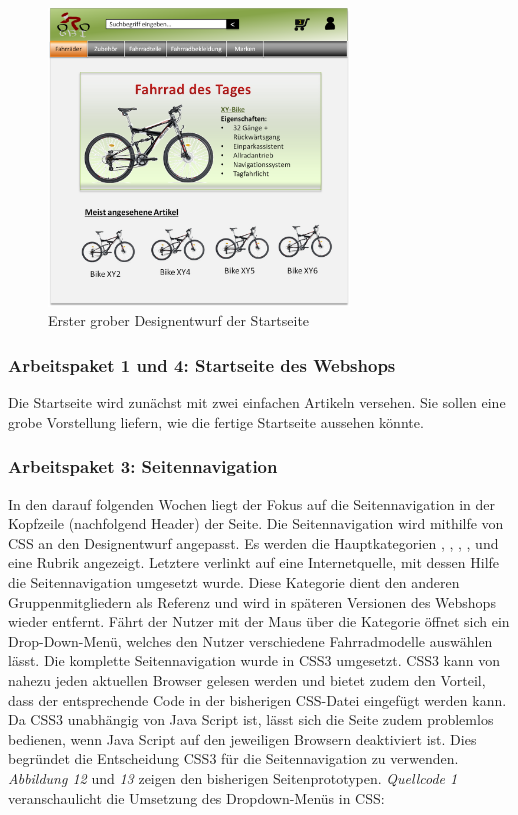 \begin{figure}[H]
\begin{center}
\includegraphics[width=8cm]{Bilder/Abbildung2-GroberDesignEntwurfDesWebshops.png}
\end{center}
\caption{Erster grober Designentwurf der Startseite}
\end{figure}


\subsubsection{Arbeitspaket 1 und 4: Startseite des Webshops}

Die Startseite wird zunächst mit zwei einfachen Artikeln versehen. Sie sollen eine grobe Vorstellung liefern, wie die fertige Startseite aussehen könnte.

\subsubsection{Arbeitspaket 3: Seitennavigation}

In den darauf folgenden Wochen liegt der Fokus auf die Seitennavigation in der Kopfzeile (nachfolgend Header) der Seite. Die Seitennavigation wird mithilfe von CSS an den Designentwurf angepasst. Es werden die Hauptkategorien \grqq{}, \grqq{}, \grqq{}, \grqq{}, \grqq{} und eine Rubrik \grqq{} angezeigt. Letztere verlinkt auf eine Internetquelle, mit dessen Hilfe die Seitennavigation umgesetzt wurde. Diese Kategorie dient den anderen Gruppenmitgliedern als Referenz und wird in späteren Versionen des Webshops wieder entfernt. Fährt der Nutzer mit der Maus über die Kategorie \grqq{} öffnet sich ein Drop-Down-Menü, welches den Nutzer verschiedene Fahrradmodelle auswählen lässt. Die komplette Seitennavigation wurde in CSS3 umgesetzt. CSS3 kann von nahezu jeden aktuellen Browser gelesen werden und bietet zudem den Vorteil, dass der entsprechende Code in der bisherigen CSS-Datei eingefügt werden kann. Da CSS3 unabhängig von Java Script ist, lässt sich die Seite zudem problemlos bedienen, wenn Java Script auf den jeweiligen Browsern deaktiviert ist. Dies begründet die Entscheidung CSS3 für die Seitennavigation zu verwenden.
\\
\textit{Abbildung 12} und \textit{13} zeigen den bisherigen Seitenprototypen. \textit{Quellcode 1} veranschaulicht die Umsetzung des Dropdown-Menüs in CSS:

